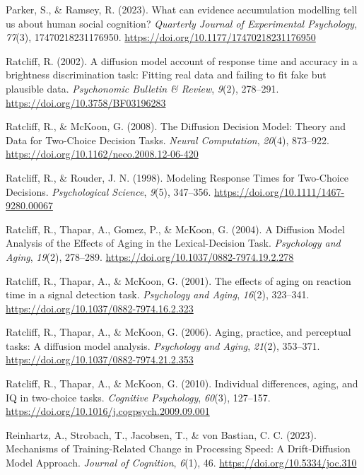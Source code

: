 \documentclass[
  man, donotrepeattitle,floatsintext]{apa6}
\newlength{\cslhangindent}
\newenvironment{CSLReferences}[2] %
 {\begin{list}{}{%
  \setlength{\itemindent}{0pt}
  \setlength{\leftmargin}{0pt}
  \setlength{\parsep}{0pt}
  \ifodd #1
   \setlength{\leftmargin}{\cslhangindent}
   \setlength{\itemindent}{-1\cslhangindent}
  \fi
  \setlength{\itemsep}{#2\baselineskip}}}
 {\end{list}}
\begin{document}
\begin{CSLReferences}{1}{0}
Parker, S., \& Ramsey, R. (2023). What can evidence accumulation modelling tell us about human social cognition? \emph{Quarterly Journal of Experimental Psychology}, \emph{77}(3), 17470218231176950. \url{https://doi.org/10.1177/17470218231176950}

Ratcliff, R. (2002). A diffusion model account of response time and accuracy in a brightness discrimination task: {Fitting} real data and failing to fit fake but plausible data. \emph{Psychonomic Bulletin \& Review}, \emph{9}(2), 278--291. \url{https://doi.org/10.3758/BF03196283}

Ratcliff, R., \& McKoon, G. (2008). The {Diffusion Decision Model}: {Theory} and {Data} for {Two-Choice Decision Tasks}. \emph{Neural Computation}, \emph{20}(4), 873--922. \url{https://doi.org/10.1162/neco.2008.12-06-420}

Ratcliff, R., \& Rouder, J. N. (1998). Modeling {Response Times} for {Two-Choice Decisions}. \emph{Psychological Science}, \emph{9}(5), 347--356. \url{https://doi.org/10.1111/1467-9280.00067}

Ratcliff, R., Thapar, A., Gomez, P., \& McKoon, G. (2004). A {Diffusion Model Analysis} of the {Effects} of {Aging} in the {Lexical-Decision Task}. \emph{Psychology and Aging}, \emph{19}(2), 278--289. \url{https://doi.org/10.1037/0882-7974.19.2.278}

Ratcliff, R., Thapar, A., \& McKoon, G. (2001). The effects of aging on reaction time in a signal detection task. \emph{Psychology and Aging}, \emph{16}(2), 323--341. \url{https://doi.org/10.1037/0882-7974.16.2.323}

Ratcliff, R., Thapar, A., \& McKoon, G. (2006). Aging, practice, and perceptual tasks: {A} diffusion model analysis. \emph{Psychology and Aging}, \emph{21}(2), 353--371. \url{https://doi.org/10.1037/0882-7974.21.2.353}

Ratcliff, R., Thapar, A., \& McKoon, G. (2010). Individual differences, aging, and {IQ} in two-choice tasks. \emph{Cognitive Psychology}, \emph{60}(3), 127--157. \url{https://doi.org/10.1016/j.cogpsych.2009.09.001}

Reinhartz, A., Strobach, T., Jacobsen, T., \& von Bastian, C. C. (2023). Mechanisms of {Training-Related Change} in {Processing Speed}: {A Drift-Diffusion Model Approach}. \emph{Journal of Cognition}, \emph{6}(1), 46. \url{https://doi.org/10.5334/joc.310}


\end{CSLReferences}
\end{document}
